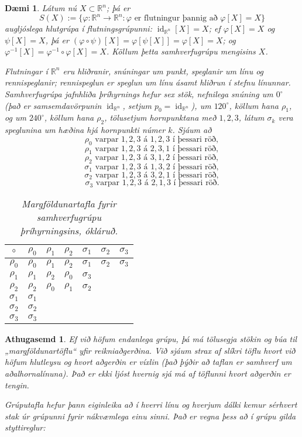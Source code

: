 \documentclass[a4paper,icelandic,11pt]{book}
\theoremstyle{plain}
\newtheorem{daemi}{Dæmi}[chapter]
\newtheorem*{ath}{Athugasemd}
\newcommand{\R}{\mathbb{R}}
\DeclareMathOperator{\id}{id} %
\begin{document}
\begin{daemi}
  Látum nú $X\subset \R^n$; þá er \[ S(X) := \{ \varphi:\R^n \to \R^n: \varphi
  \text{ er flutningur þannig að } \varphi[X] = X \} \] augljóslega hlutgrúpa í
  flutningsgrúpunni: $\id_{\R^n} [X] = X$; ef $\varphi[X] = X$ og $\psi[X] = X$,
  þá er $(\varphi \circ \psi)[X] = \varphi[\psi[X]] = \varphi [X] = X$; og
  $\varphi^{-1}[X] = \varphi^{-1}\circ \varphi[X] = X$.  Köllum þetta
  \emph{samhverfugrúpu} mengisins $X$.

  Flutningar í $\R^n$ eru hliðranir, snúningar um punkt, speglanir um línu og
  rennispeglanir; rennispeglun er speglun um línu ásamt hliðrun í stefnu
  línunnar. Samhverfugrúpa jafnhliða þríhyrnings hefur sex stök, nefnilega
  snúning um $0^\circ$ (það er samsemdavörpunin $\id_{\R^n}$, setjum $p_0 =
  \id_{\R^n}$), um $120^\circ$, köllum hana $\rho_1$, og um $240^\circ$, köllum
  hana $\rho_2$, tölusetjum hornpunktana með $1,2,3$, látum $\sigma_k$ vera
  speglunina um hæðina hjá hornpunkti númer $k$.  Sjáum að
  \[ \rho_0 \text{ varpar } 1,2,3 \text{ á } 1,2,3 \text{ í þessari röð}, \]
  \[ \rho_1 \text{ varpar } 1,2,3 \text{ á } 2,3,1 \text{ í þessari röð}, \]
  \[ \rho_2 \text{ varpar } 1,2,3 \text{ á } 3,1,2 \text{ í þessari röð}, \]
  \[ \sigma_1 \text{ varpar } 1,2,3 \text{ á } 1,3,2 \text{ í þessari röð}, \]
  \[ \sigma_2 \text{ varpar } 1,2,3 \text{ á } 3,2,1 \text{ í þessari röð}, \]
  \[ \sigma_3 \text{ varpar } 1,2,3 \text{ á } 2,1,3 \text{ í þessari röð}. \]
  \begin{table}[h]
    \centering
    \begin{tabular}{c|cccccc}
      $\circ$ & $\rho_0$ & $\rho_1$ & $\rho_2$ & $\sigma_1$ & $\sigma_2$ & $\sigma_3$ 
      \\\hline
      $\rho_0$ & $\rho_0$ & $\rho_1$ & $\rho_2$ & $\sigma_1$ & $\sigma_2$ & $\sigma_3$ \\
      $\rho_1$ & $\rho_1$ & $\rho_2$ & $\rho_0$ & $\sigma_3$ & & \\
      $\rho_2$ & $\rho_2$ & $\rho_0$ & $\rho_1$ & $\sigma_2$ && \\
      $\sigma_1$ & $\sigma_1$ &&&&& \\
      $\sigma_2$ & $\sigma_2$ &&&&& \\
      $\sigma_3$ & $\sigma_3$ &&&&&
    \end{tabular}
    \caption{Margföldunartafla fyrir samhverfugrúpu þríhyrningsins, \emph{ókláruð}.}
    \label{tab:gruputafla_snuningur_speglun}
  \end{table}
\end{daemi}
\begin{ath}
  Ef við höfum endanlega grúpu, þá má tölusegja stökin og búa til
  „margföldunartöflu“ yfir reikniaðgerðina. Við sjáum strax af slíkri töflu
  hvort við höfum hlutleysu og hvort aðgerðin er víxlin (það þýðir að taflan
  er samhverf um \emph{aðalhornalínuna}). Það er ekki ljóst hvernig sjá má
  af töflunni hvort aðgerðin er tengin.
  
  \emph{Grúputafla} hefur þann
  eiginleika að í hverri línu og hverjum dálki kemur sérhvert stak úr grúpunni
  fyrir nákvæmlega einu sinni. Það er vegna þess að í grúpu gilda
  \emph{styttireglur}:
\end{ath}  
\end{document}
